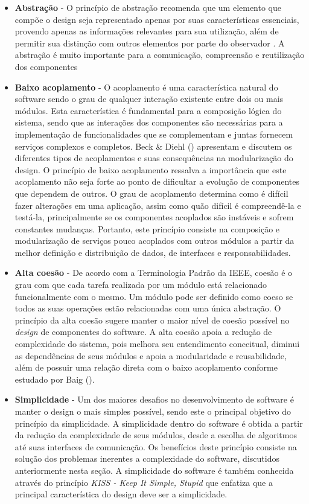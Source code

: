 \begin{itemize}
\item \textbf{Abstração} - O princípio de abstração recomenda que um elemento que compõe o design seja representado apenas por suas características essenciais, provendo apenas as informações relevantes  para sua utilização, além de permitir sua distinção com outros elementos por parte do observador \cite{germoglio2009}. A abstração é muito importante para a comunicação, compreensão e reutilização dos componentes
\item \textbf{Baixo acoplamento} - O acoplamento é uma característica natural do software sendo o grau de qualquer interação existente entre dois ou mais módulos. Esta característica é fundamental para a composição lógica do sistema, sendo que as interações dos componentes são necessárias para a implementação de funcionalidades que se complementam e juntas fornecem serviços complexos e completos. Beck \& Diehl (\citeyear{diehl2011}) apresentam e discutem os diferentes tipos de acoplamentos e suas consequências na modularização do design. O princípio de baixo acoplamento ressalva a importância que este acoplamento não seja forte ao ponto de dificultar a evolução de componentes que dependem de outros. O grau de acoplamento determina como é difícil fazer alterações em uma aplicação, assim como quão difícil é compreendê-la e testá-la, principalmente se os componentes acoplados são instáveis e sofrem constantes mudanças. Portanto, este princípio consiste na composição e modularização de serviços pouco acoplados com outros módulos a partir da melhor definição e distribuição de dados, de interfaces e responsabilidades.
\item \textbf{Alta coesão} - De acordo com a Terminologia Padrão da IEEE, coesão é o grau com que cada tarefa realizada por um módulo está relacionado funcionalmente com o mesmo. Um módulo pode ser definido como coeso se todos as suas operações estão relacionadas com uma única abstração.  O princípio da alta coesão sugere manter o maior nível de coesão possível no \emph{design} de componentes do software. A alta coesão apoia a redução de complexidade do sistema, pois melhora seu entendimento conceitual, diminui as dependências de seus módulos e apoia a modularidade e reusabilidade, além de possuir uma relação direta com o baixo acoplamento conforme estudado por Baig (\citeyear{baig2004}).
\item \textbf{Simplicidade} - Um dos maiores desafios no desenvolvimento de software é manter o design o mais simples possível, sendo este o principal objetivo do princípio da simplicidade. A simplicidade dentro do software é obtida a partir da redução da complexidade de seus módulos, desde a escolha de algoritmos até suas interfaces de comunicação. Os benefícios deste princípio consiste na solução dos problemas inerentes a complexidade do software, discutidos anteriormente nesta seção. A simplicidade do software é também conhecida através do princípio \emph{KISS - Keep It Simple, Stupid} que enfatiza que a principal característica do design deve ser a simplicidade.
\end{itemize}

